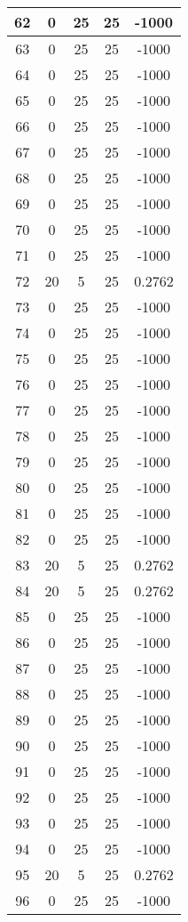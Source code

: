 \documentclass[letterpaper, 12pt]{article}
\begin{document}
\begin{longtable}{|c|c|c|c|c|}
\hline
62 & 0 & 25 & 25 & -1000 \\
\hline
63 & 0 & 25 & 25 & -1000 \\
\hline
64 & 0 & 25 & 25 & -1000 \\
\hline
65 & 0 & 25 & 25 & -1000 \\
\hline
66 & 0 & 25 & 25 & -1000 \\
\hline
67 & 0 & 25 & 25 & -1000 \\
\hline
68 & 0 & 25 & 25 & -1000 \\
\hline
69 & 0 & 25 & 25 & -1000 \\
\hline
70 & 0 & 25 & 25 & -1000 \\
\hline
71 & 0 & 25 & 25 & -1000 \\
\hline
72 & 20 & 5 & 25 & 0.2762 \\
\hline
73 & 0 & 25 & 25 & -1000 \\
\hline
74 & 0 & 25 & 25 & -1000 \\
\hline
75 & 0 & 25 & 25 & -1000 \\
\hline
76 & 0 & 25 & 25 & -1000 \\
\hline
77 & 0 & 25 & 25 & -1000 \\
\hline
78 & 0 & 25 & 25 & -1000 \\
\hline
79 & 0 & 25 & 25 & -1000 \\
\hline
80 & 0 & 25 & 25 & -1000 \\
\hline
81 & 0 & 25 & 25 & -1000 \\
\hline
82 & 0 & 25 & 25 & -1000 \\
\hline
83 & 20 & 5 & 25 & 0.2762 \\
\hline
84 & 20 & 5 & 25 & 0.2762 \\
\hline
85 & 0 & 25 & 25 & -1000 \\
\hline
86 & 0 & 25 & 25 & -1000 \\
\hline
87 & 0 & 25 & 25 & -1000 \\
\hline
88 & 0 & 25 & 25 & -1000 \\
\hline
89 & 0 & 25 & 25 & -1000 \\
\hline
90 & 0 & 25 & 25 & -1000 \\
\hline
91 & 0 & 25 & 25 & -1000 \\
\hline
92 & 0 & 25 & 25 & -1000 \\
\hline
93 & 0 & 25 & 25 & -1000 \\
\hline
94 & 0 & 25 & 25 & -1000 \\
\hline
95 & 20 & 5 & 25 & 0.2762 \\
\hline
96 & 0 & 25 & 25 & -1000 \\

\end{longtable}
\end{document}

